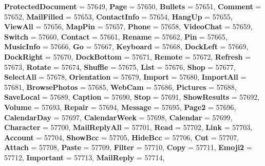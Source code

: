 \begin{DoxyCompactItemize}
\newline
{\bfseries Protected\+Document} = 57649, 
{\bfseries Page} = 57650, 
{\bfseries Bullets} = 57651, 
{\bfseries Comment} = 57652, 
\newline
{\bfseries Mail\+Filled} = 57653, 
{\bfseries Contact\+Info} = 57654, 
{\bfseries Hang\+Up} = 57655, 
{\bfseries View\+All} = 57656, 
\newline
{\bfseries Map\+Pin} = 57657, 
{\bfseries Phone} = 57658, 
{\bfseries Video\+Chat} = 57659, 
{\bfseries Switch} = 57660, 
\newline
{\bfseries Contact} = 57661, 
{\bfseries Rename} = 57662, 
{\bfseries Pin} = 57665, 
{\bfseries Music\+Info} = 57666, 
\newline
{\bfseries Go} = 57667, 
{\bfseries Keyboard} = 57668, 
{\bfseries Dock\+Left} = 57669, 
{\bfseries Dock\+Right} = 57670, 
\newline
{\bfseries Dock\+Bottom} = 57671, 
{\bfseries Remote} = 57672, 
{\bfseries Refresh} = 57673, 
{\bfseries Rotate} = 57674, 
\newline
{\bfseries Shuffle} = 57675, 
{\bfseries List} = 57676, 
{\bfseries Shop} = 57677, 
{\bfseries Select\+All} = 57678, 
\newline
{\bfseries Orientation} = 57679, 
{\bfseries Import} = 57680, 
{\bfseries Import\+All} = 57681, 
{\bfseries Browse\+Photos} = 57685, 
\newline
{\bfseries Web\+Cam} = 57686, 
{\bfseries Pictures} = 57688, 
{\bfseries Save\+Local} = 57689, 
{\bfseries Caption} = 57690, 
\newline
{\bfseries Stop} = 57691, 
{\bfseries Show\+Results} = 57692, 
{\bfseries Volume} = 57693, 
{\bfseries Repair} = 57694, 
\newline
{\bfseries Message} = 57695, 
{\bfseries Page2} = 57696, 
{\bfseries Calendar\+Day} = 57697, 
{\bfseries Calendar\+Week} = 57698, 
\newline
{\bfseries Calendar} = 57699, 
{\bfseries Character} = 57700, 
{\bfseries Mail\+Reply\+All} = 57701, 
{\bfseries Read} = 57702, 
\newline
{\bfseries Link} = 57703, 
{\bfseries Account} = 57704, 
{\bfseries Show\+Bcc} = 57705, 
{\bfseries Hide\+Bcc} = 57706, 
\newline
{\bfseries Cut} = 57707, 
{\bfseries Attach} = 57708, 
{\bfseries Paste} = 57709, 
{\bfseries Filter} = 57710, 
\newline
{\bfseries Copy} = 57711, 
{\bfseries Emoji2} = 57712, 
{\bfseries Important} = 57713, 
{\bfseries Mail\+Reply} = 57714, 
\newline

\end{DoxyCompactItemize}
